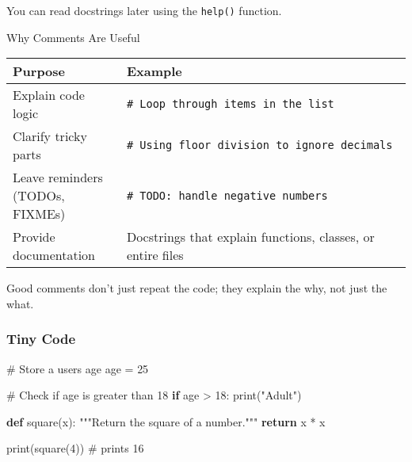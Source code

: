 \documentclass[
  letterpaper,
  DIV=11,
  numbers=noendperiod]{scrreprt}
\newenvironment{Shaded}{\begin{snugshade}}{\end{snugshade}}
\newcommand{\BuiltInTok}[1]{\textcolor[rgb]{0.00,0.23,0.31}{#1}}
\newcommand{\CommentTok}[1]{\textcolor[rgb]{0.37,0.37,0.37}{#1}}
\newcommand{\ControlFlowTok}[1]{\textcolor[rgb]{0.00,0.23,0.31}{\textbf{#1}}}
\newcommand{\DecValTok}[1]{\textcolor[rgb]{0.68,0.00,0.00}{#1}}
\newcommand{\KeywordTok}[1]{\textcolor[rgb]{0.00,0.23,0.31}{\textbf{#1}}}
\newcommand{\NormalTok}[1]{\textcolor[rgb]{0.00,0.23,0.31}{#1}}
\newcommand{\OperatorTok}[1]{\textcolor[rgb]{0.37,0.37,0.37}{#1}}
\newcommand{\StringTok}[1]{\textcolor[rgb]{0.13,0.47,0.30}{#1}}
\begin{document}
You can read docstrings later using the \texttt{help()} function.

Why Comments Are Useful

\begin{longtable}[]{@{}
  >{\raggedright\arraybackslash}p{}
  >{\raggedright\arraybackslash}p{}@{}}
\toprule\noalign{}
\begin{minipage}[b]{\linewidth}\raggedright
Purpose
\end{minipage} & \begin{minipage}[b]{\linewidth}\raggedright
Example
\end{minipage} \\
\midrule\noalign{}
\endhead
\bottomrule\noalign{}
\endlastfoot
Explain code logic & \texttt{\#\ Loop\ through\ items\ in\ the\ list} \\
Clarify tricky parts &
\texttt{\#\ Using\ floor\ division\ to\ ignore\ decimals} \\
Leave reminders (TODOs, FIXMEs) &
\texttt{\#\ TODO:\ handle\ negative\ numbers} \\
Provide documentation & Docstrings that explain functions, classes, or
entire files \\
\end{longtable}

Good comments don't just repeat the code; they explain the why, not just
the what.

\subsubsection{Tiny Code}\label{tiny-code-9}

\begin{Shaded}
\begin{Highlighting}[]
\CommentTok{\# Store a user\textquotesingle{}s age}
\NormalTok{age }\OperatorTok{=} \DecValTok{25}

\CommentTok{\# Check if age is greater than 18}
\ControlFlowTok{if}\NormalTok{ age }\OperatorTok{\textgreater{}} \DecValTok{18}\NormalTok{:}
    \BuiltInTok{print}\NormalTok{(}\StringTok{"Adult"}\NormalTok{)}

\KeywordTok{def}\NormalTok{ square(x):}
    \CommentTok{"""Return the square of a number."""}
    \ControlFlowTok{return}\NormalTok{ x }\OperatorTok{*}\NormalTok{ x}

\BuiltInTok{print}\NormalTok{(square(}\DecValTok{4}\NormalTok{))  }\CommentTok{\# prints 16}
\end{Highlighting}
\end{Shaded}
\end{document}

